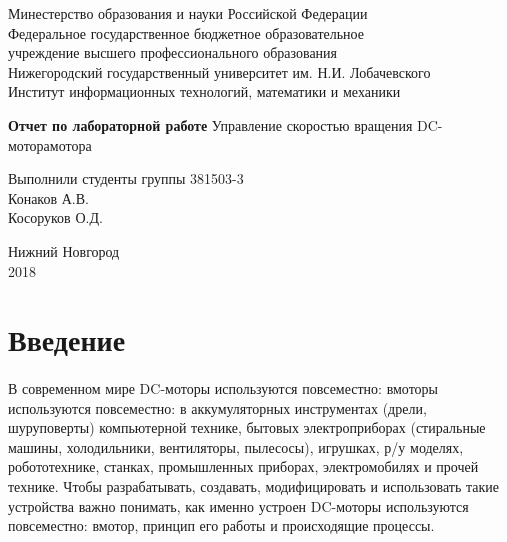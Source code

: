 \documentclass[12pt]{article}
\begin{document}
\begin{center}
\normalsize{Минестерство образования и науки Российской Федерации}\\
\normalsize{Федеральное государственное бюджетное образовательное}\\ 
\normalsize{учреждение высшего профессионального образования}\\
\normalsize{{Нижегородский государственный университет им. Н.И. Лобачевского}}\\
\hfill \break
\normalsize{{Институт информационных технологий, математики и механики}}\\
\end{center}
\vfill
\begin{center}
\hfill \break

\Large
{
\textbf{Отчет по лабораторной работе}
\linebreak
Управление скоростью вращения DC-моторамотора
}
\end{center}
\vfill


\begin{flushright}
\large{
Выполнили студенты группы 381503-3\\
Конаков А.В.\\
Косоруков О.Д.\\
}

\end{flushright}


 
\vfill
\begin{center} 
Нижний Новгород\\ 2018 
\end{center}
\pagebreak






\newpage
\tableofcontents
\newpage








\section*{Введение}
\paragraph{}
В современном мире DC-моторы используются повсеместно: вмоторы используются повсеместно: в
аккумуляторных инструментах (дрели, шуруповерты)
компьютерной технике, бытовых электроприборах
(стиральные машины, холодильники, вентиляторы,
пылесосы), игрушках, р/у моделях, робототехнике, станках,
промышленных приборах, электромобилях и прочей технике.
Чтобы разрабатывать, создавать, модифицировать и
использовать такие устройства важно понимать, как именно
устроен DC-моторы используются повсеместно: вмотор, принцип его работы и происходящие
процессы.\hfill
\end{document}
